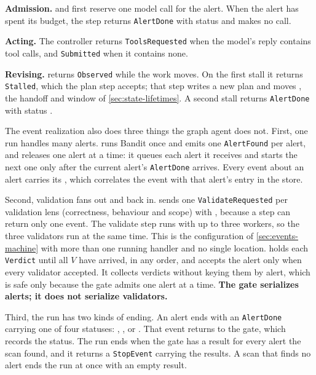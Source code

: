 \bi

\item \textbf{Admission.}  and  first reserve one model call for
the alert. When the alert has spent its budget, the step returns \texttt{AlertDone} with status
 and makes no call.

\item \textbf{Acting.} The controller returns \texttt{ToolsRequested} when the model's reply
contains tool calls, and \texttt{Submitted} when it contains none.

\item \textbf{Revising.}  returns \texttt{Observed} while the work moves. On the
first stall it returns \texttt{Stalled}, which the plan step accepts; that step writes a new plan
and moves , the handoff and window of \cref{sec:state-lifetimes}. A second
stall returns \texttt{AlertDone} with status .

\ei

The event realization also does three things the graph agent does not. First, one run handles
many alerts.  runs Bandit once and emits one \texttt{AlertFound} per alert, and
 releases one alert at a time: it queues each alert it receives and starts the next
one only after the current alert's \texttt{AlertDone} arrives. Every event about an alert carries
its , which correlates the event with that alert's entry in the store.

Second, validation fans out and back in.  sends one \texttt{ValidateRequested} per
validation lens (correctness, behaviour and scope) with , because a step
can return only one event. The validate step runs with up to three workers, so the three
validators run at the same time. This is the configuration of \cref{sec:events-machine} with more
than one running handler and no single location.  holds each \texttt{Verdict}
until all $V$ have arrived, in any order, and accepts the alert only when every validator accepted.
It collects verdicts without keying them by alert, which is safe only because the gate admits one
alert at a time. \textbf{The gate serializes alerts; it does not serialize validators.}

Third, the run has two kinds of ending. An alert ends with an \texttt{AlertDone} carrying one of
four statuses: , ,  or
. That event returns to the gate, which records the status. The run
ends when the gate has a result for every alert the scan found, and it returns a
\texttt{StopEvent} carrying the results. A scan that finds no alert ends the run at once with an
empty result.

